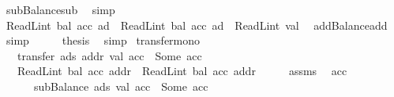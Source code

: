 \begin{isabellebody}
\ subBalance{\isacharunderscore}{\kern0pt}sub\ \isamarkupfalse%
\ simp\isanewline
\ \ \isamarkupfalse%
\ \isamarkupfalse%
\ {\isacharasterisk}{\kern0pt}{\isacharasterisk}{\kern0pt}\ \isamarkupfalse%
\ {\isachardoublequoteopen}ReadL\isactrlsub i\isactrlsub n\isactrlsub t\ {\isacharparenleft}{\kern0pt}bal\ {\isacharparenleft}{\kern0pt}acc{\isacharprime}{\kern0pt}\ ad{\isacharparenright}{\kern0pt}{\isacharparenright}{\kern0pt}\ {\isacharequal}{\kern0pt}\ ReadL\isactrlsub i\isactrlsub n\isactrlsub t\ {\isacharparenleft}{\kern0pt}bal\ {\isacharparenleft}{\kern0pt}acc{\isacharprime}{\kern0pt}{\isacharprime}{\kern0pt}\ ad{\isacharparenright}{\kern0pt}{\isacharparenright}{\kern0pt}\ {\isacharplus}{\kern0pt}\ ReadL\isactrlsub i\isactrlsub n\isactrlsub t\ val{\isachardoublequoteclose}\ \isamarkupfalse%
\ addBalance{\isacharunderscore}{\kern0pt}add\ \isamarkupfalse%
\ simp\isanewline
\ \ \isamarkupfalse%
\ \isamarkupfalse%
\ {\isacharquery}{\kern0pt}thesis\ \isamarkupfalse%
\ simp\isanewline
{}\isamarkupfalse%
%
\endisatagproof
{\isafoldproof}%
%
\isadelimproof
\isanewline
%
\endisadelimproof
\isanewline
{}\isamarkupfalse%
\ transfer{\isacharunderscore}{\kern0pt}mono{\isacharcolon}{\kern0pt}\isanewline
\ \ \ {\isachardoublequoteopen}transfer\ ads\ addr\ val\ acc\ {\isacharequal}{\kern0pt}\ Some\ acc{\isacharprime}{\kern0pt}{\isachardoublequoteclose}\isanewline
\ \ \ {\isachardoublequoteopen}ReadL\isactrlsub i\isactrlsub n\isactrlsub t\ {\isacharparenleft}{\kern0pt}bal\ {\isacharparenleft}{\kern0pt}acc{\isacharprime}{\kern0pt}\ addr{\isacharparenright}{\kern0pt}{\isacharparenright}{\kern0pt}\ {\isasymge}\ ReadL\isactrlsub i\isactrlsub n\isactrlsub t\ {\isacharparenleft}{\kern0pt}bal\ {\isacharparenleft}{\kern0pt}acc\ addr{\isacharparenright}{\kern0pt}{\isacharparenright}{\kern0pt}{\isachardoublequoteclose}\isanewline
%
\isadelimproof
%
\endisadelimproof
%
\isatagproof
{}\isamarkupfalse%
\ {\isacharminus}{\kern0pt}\isanewline
\ \ \isamarkupfalse%
\ assms{\isacharparenleft}{\kern0pt}{}{\isacharparenright}{\kern0pt}\ \isamarkupfalse%
\ acc{\isacharprime}{\kern0pt}{\isacharprime}{\kern0pt}\isanewline
\ \ \ \ \ {\isacharasterisk}{\kern0pt}{\isacharcolon}{\kern0pt}\ {\isachardoublequoteopen}subBalance\ ads\ val\ acc\ {\isacharequal}{\kern0pt}\ Some\ acc{\isacharprime}{\kern0pt}{\isacharprime}{\kern0pt}{\isachardoublequoteclose}\isanewline

\end{isabellebody}
